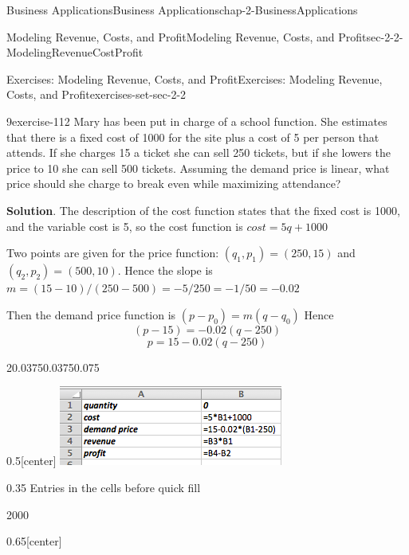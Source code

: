 \documentclass[oneside,10pt,]{book}
\numberwithin{equation}{section}
\begin{document}
\begin{chapterptx}{Business Applications}{}{Business Applications}{}{}{chap-2-BusinessApplications}
\begin{sectionptx}{Modeling Revenue, Costs, and Profit}{}{Modeling Revenue, Costs, and Profit}{}{}{sec-2-2-ModelingRevenueCostProfit}
\begin{exercises-subsection-numberless}{Exercises: Modeling Revenue, Costs, and Profit}{}{Exercises: Modeling Revenue, Costs, and Profit}{}{}{exercises-set-sec-2-2}
\begin{divisionexercise}{9}{}{}{exercise-112}
Mary has been put in charge of a school function.  She estimates that there is a fixed cost of \textdollar{}1000 for the site plus a cost of \textdollar{}5 per person that attends.  If she charges \textdollar{}15 a ticket she can sell 250 tickets, but if she lowers the price to \textdollar{}10 she can sell 500 tickets.  Assuming the demand price is linear, what price should she charge to break even while maximizing attendance?%
\par\smallskip%
\noindent\textbf{Solution}.\hypertarget{solution-54}{}\quad%
\hypertarget{p-744}{}%
The description of the cost function states that the fixed cost is \textdollar{}1000, and the variable cost is \textdollar{}5, so the cost function is \(cost=5 q+1000\)%
\par
\hypertarget{p-745}{}%
Two points are given for the price function: \((q_1  ,p_1 )=(250,15)\) and \((q_2  ,p_2 )=(500,10)\). Hence the slope is \(m=  (15-10)/(250-500)= -5/250= -1/50=-0.02\)%
\par
\hypertarget{p-746}{}%
Then the demand price function is \((p-p_0 )= m (q-q_0)\) Hence%
%
\begin{equation*}
(p-15)= -0.02 (q-250)
\end{equation*}
%
\begin{equation*}
p=15 -0.02 (q-250)
\end{equation*}
\begin{sidebyside}{2}{0.0375}{0.0375}{0.075}%
\begin{sbspanel}{0.5}[center]%
\includegraphics[width=1\linewidth]{images/sec2-2-sol9a.png}
\end{sbspanel}%
\begin{sbspanel}{0.35}%
\hypertarget{p-747}{}%
Entries in the cells before quick fill%
\end{sbspanel}%
\end{sidebyside}%
\begin{sidebyside}{2}{0}{0}{0}%
\begin{sbspanel}{0.65}[center]%

\end{sbspanel}
\end{sidebyside}
\end{divisionexercise}
\end{exercises-subsection-numberless}
\end{sectionptx}
\end{chapterptx}
\end{document}
